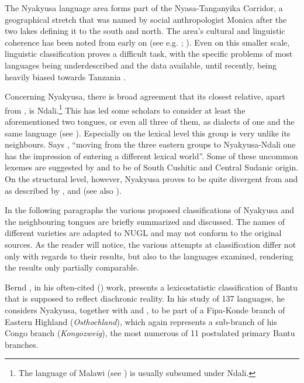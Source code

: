 The Nyakyusa language area forms part of the Nyasa-Tanganyika Corridor, a geographical stretch that was named by social anthropologist Monica \citet{WilsonM1958} after the two lakes defining it to the south and north. The area's cultural and linguistic coherence has been noted from early on (see e.g. \citealt{FuellebornF1906}; \citealt{JohnstonH1977}). Even on this smaller scale, linguistic classification proves a difficult task, with the specific problems of most languages being underdescribed and the data available, until recently, being heavily biased towards Tanzania \citep{NurseD1988}.

Concerning Nyakyusa, there is broad agreement that its closest relative, apart from , is Ndali.\footnote{The  language of Malawi (see \citealt{KershnerT2002}) is usually subsumed under Ndali.} This has led some scholars to consider at least the aforementioned two tongues, or even all three of them, as dialects of one and the same language (see \citealt[9]{WilsonM1958}). Especially on the lexical level this group is very unlike its neighbours. Says \citet[72f]{NurseD1988}, ``moving from the three eastern groups to Nyakyusa-Ndali one has the impression of entering a different lexical world''. Some of these uncommon lexemes are suggested by \citet{NurseD1988} and \citet{EhretC1973} to be of South Cushitic and Central Sudanic origin. On the structural level, however, Nyakyusa proves to be quite divergent from  and  as described by \citet{BotneR2008}, \citet{LabroussiC1998} and \citet{KishindoP1999} (see also \citealt[55]{NurseD1988}).%

In the following paragraphs the various proposed classifications of Nyakyusa and the neighbouring tongues are briefly summarized and discussed. The names of different varieties are adapted to NUGL \citep{MahoJ2009} and may not conform to the original sources. As the reader will notice, the various attempts at classification differ not only with regards to their results, but also to the languages examined, rendering the results only partially comparable.

Bernd \citeauthor{HeineB1972}, in his often-cited (\citeyear{HeineB1972}) work, presents a lexicostatistic classification of Bantu that is supposed to reflect diachronic reality. In his study of 137 languages, he considers Nyakyusa, together with  and , to be part of a Fipa-Konde branch of Eastern Highland (\textit{Osthochland}), which again represents a sub-branch of his Congo branch (\textit{Kongozweig}), the most numerous of 11 postulated primary Bantu branches.

